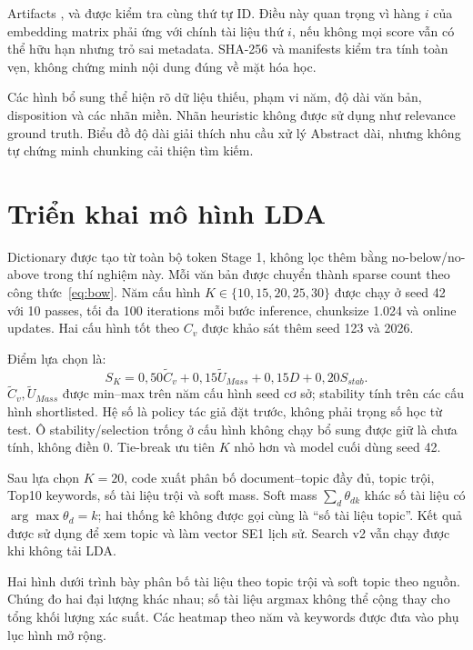 Artifacts ,  và  được kiểm tra cùng thứ tự ID. Điều này quan trọng vì hàng $i$ của embedding matrix phải ứng với chính tài liệu thứ $i$, nếu không mọi score vẫn có thể hữu hạn nhưng trỏ sai metadata. SHA-256 và manifests kiểm tra tính toàn vẹn, không chứng minh nội dung đúng về mặt hóa học.

Các hình bổ sung thể hiện rõ dữ liệu thiếu, phạm vi năm, độ dài văn bản, disposition và các nhãn miền. Nhãn heuristic không được sử dụng như relevance ground truth. Biểu đồ độ dài giải thích nhu cầu xử lý Abstract dài, nhưng không tự chứng minh chunking cải thiện tìm kiếm.

\section{Triển khai mô hình LDA}
Dictionary được tạo từ toàn bộ token Stage 1, không lọc thêm bằng no-below/no-above trong thí nghiệm này. Mỗi văn bản được chuyển thành sparse count theo công thức~\eqref{eq:bow}. Năm cấu hình $K\in\{10,15,20,25,30\}$ được chạy ở seed 42 với 10 passes, tối đa 100 iterations mỗi bước inference, chunksize 1.024 và online updates. Hai cấu hình tốt theo $C_v$ được khảo sát thêm seed 123 và 2026.

Điểm lựa chọn là:
\begin{equation}\label{eq:selection}
S_K=0,50\widetilde C_v+0,15\widetilde U_{Mass}+0,15D+0,20S_{stab}.
\end{equation}
$\widetilde C_v,\widetilde U_{Mass}$ được min--max trên năm cấu hình seed cơ sở; stability tính trên các cấu hình shortlisted. Hệ số là policy tác giả đặt trước, không phải trọng số học từ test. Ô stability/selection trống ở cấu hình không chạy bổ sung được giữ là chưa tính, không điền 0. Tie-break ưu tiên $K$ nhỏ hơn và model cuối dùng seed 42.

Sau lựa chọn $K=20$, code xuất phân bố document--topic đầy đủ, topic trội, Top10 keywords, số tài liệu trội và soft mass. Soft mass $\sum_d\theta_{dk}$ khác số tài liệu có $\arg\max\theta_d=k$; hai thống kê không được gọi cùng là ``số tài liệu topic''. Kết quả được sử dụng để xem topic và làm vector SE1 lịch sử. Search v2 vẫn chạy được khi không tải LDA.

Hai hình dưới trình bày phân bố tài liệu theo topic trội và soft topic theo nguồn. Chúng đo hai đại lượng khác nhau; số tài liệu argmax không thể cộng thay cho tổng khối lượng xác suất. Các heatmap theo năm và keywords được đưa vào phụ lục hình mở rộng.


